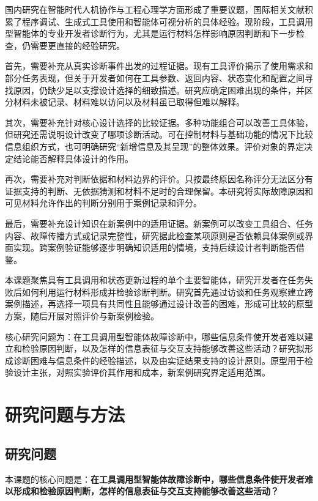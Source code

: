 国内研究在智能时代人机协作与工程心理学方面形成了重要议题，国际相关文献积累了程序调试、生成式工具使用和智能体可视分析的具体经验。现阶段，工具调用型智能体的专业开发者诊断行为，尤其是运行材料怎样影响原因判断和下一步检查，仍需要更直接的经验研究。



首先，需要补充从真实诊断事件出发的过程证据。现有工具评价揭示了使用需求和部分任务表现，但关于开发者如何在工具参数、返回内容、状态变化和配置之间寻找原因，仍缺少足以支撑设计选择的细致描述。研究应确定困难出现的条件，并区分材料未被记录、材料难以访问以及材料虽已取得但难以解释。

其次，需要补充针对核心设计选择的比较证据。多种功能组合可以改善工具体验，但研究还需说明设计改变了哪项诊断活动。可在控制材料与基础功能的情况下比较信息组织方式，也可明确研究“新增信息及其呈现”的整体效果。评价对象的界定决定结论能否解释具体设计的作用。

再次，需要补充对判断依据和材料边界的评价。只按最终原因名称评分无法区分有证据支持的判断、无依据猜测和材料不足时的合理保留。本研究将实际故障原因和可见材料允许作出的判断分别用于案例记录和评分。

最后，需要补充设计知识在新案例中的适用证据。新案例可以改变工具组合、任务内容、故障传播方式或记录完整性，研究据此检查某项原则是否依赖具体案例或界面实现。跨案例验证能够逐步明确知识适用的情境，支持后续设计者判断能否借鉴。



本课题聚焦具有工具调用和状态更新过程的单个主要智能体，研究开发者在任务失败后如何利用运行材料形成并检验诊断判断。研究首先通过访谈和任务观察建立跨案例描述，再选择一项具有共同性且能够通过设计改善的困难，形成可比较的原型方案，随后开展对照评价与新案例检验。

核心研究问题为：在工具调用型智能体故障诊断中，哪些信息条件使开发者难以建立和检验原因判断，以及怎样的信息表征与交互支持能够改善这些活动？研究拟形成诊断困难与信息条件的经验描述，以及由实证结果支持的设计原则。原型用于检验设计主张，对照实验评价其作用和成本，新案例研究界定适用范围。

\section{研究问题与方法}

\subsection{研究问题}

本课题的核心问题是：\textbf{在工具调用型智能体故障诊断中，哪些信息条件使开发者难以形成和检验原因判断，怎样的信息表征与交互支持能够改善这些活动？}

